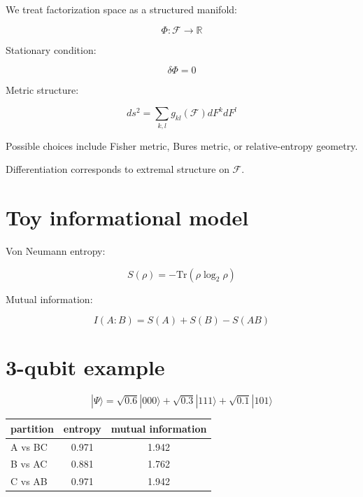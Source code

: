 \documentclass[11pt]{article}
\begin{document}
We treat factorization space as a structured manifold:

\begin{equation}
\Phi : \mathcal{F} \rightarrow \mathbb{R}
\end{equation}

Stationary condition:

\begin{equation}
\delta \Phi = 0
\end{equation}

Metric structure:

\begin{equation}
ds^2 =
\sum_{k,l}
g_{kl}(\mathcal{F})
dF^k dF^l
\end{equation}

Possible choices include Fisher metric, Bures metric, or relative-entropy geometry.

Differentiation corresponds to extremal structure on $\mathcal{F}$.

\section{Toy informational model}

Von Neumann entropy:

\begin{equation}
S(\rho)
=
-\mathrm{Tr}(\rho \log_2 \rho)
\end{equation}

Mutual information:

\begin{equation}
I(A:B)
=
S(A)+S(B)-S(AB)
\end{equation}

\section{3-qubit example}

\begin{equation}
|\Psi\rangle
=
\sqrt{0.6}|000\rangle
+
\sqrt{0.3}|111\rangle
+
\sqrt{0.1}|101\rangle
\end{equation}

\begin{center}
\begin{tabular}{lcc}
\toprule
partition & entropy & mutual information \\
\midrule
A vs BC & 0.971 & 1.942 \\
B vs AC & 0.881 & 1.762 \\
C vs AB & 0.971 & 1.942 \\
\bottomrule
\end{tabular}
\end{center}
\end{document}
